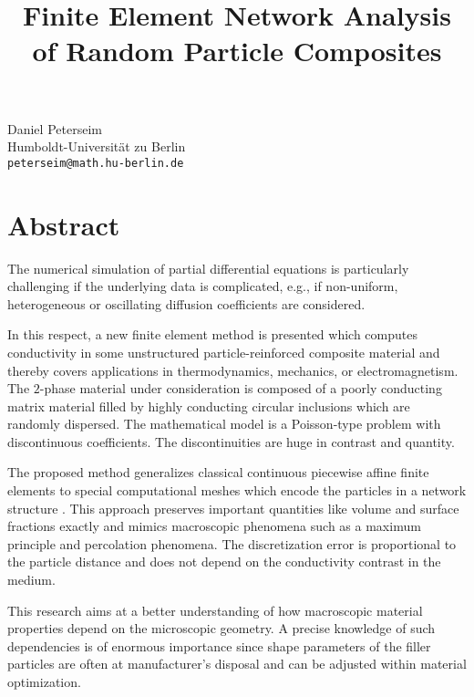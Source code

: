 \title{Finite Element Network Analysis of Random Particle Composites}
\author{} \institute{}
\maketitle

\begin{center}
{\large Daniel Peterseim}\\
Humboldt-Universit\"at zu Berlin\\
{\tt peterseim@math.hu-berlin.de}\\
\end{center}

\section*{Abstract}
The numerical simulation of partial differential equations is particularly challenging if the underlying data is complicated, e.g., if non-uniform, heterogeneous or oscillating diffusion coefficients are considered. 

In this respect, a new finite element method \cite{PeCa10}
is presented which computes conductivity in some unstructured particle-reinforced composite material and thereby covers applications in thermodynamics, mechanics, or electromagnetism. The $2$-phase material under consideration is composed of a poorly conducting matrix material filled by highly conducting circular inclusions which are randomly dispersed. The mathematical model is a Poisson-type problem with discontinuous coefficients. The discontinuities are huge in contrast and quantity.

The proposed method generalizes classical continuous piecewise affine finite elements to special computational meshes which encode the particles in a network structure \cite{DP09,P10}.
This approach preserves important quantities like volume and surface fractions exactly and mimics macroscopic phenomena such as a maximum principle and percolation phenomena. The discretization error is proportional to the particle distance and does not depend on the conductivity contrast in the medium.

This research aims at a better understanding of how macroscopic material properties depend on the microscopic geometry. A precise knowledge of such dependencies is of enormous importance since shape parameters of the filler particles are often at manufacturer's disposal and can be adjusted within material optimization.

